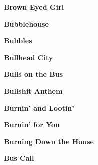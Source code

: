 \begin{center}\textbf{Brown Eyed Girl}\end{center}
\newline
\vspace{10pt} 
\begin{center}\textbf{Bubblehouse}\end{center}
\newline
\vspace{10pt} 
\begin{center}\textbf{Bubbles}\end{center}
\newline
\vspace{10pt} 
\begin{center}\textbf{Bullhead City}\end{center}
\newline
\vspace{10pt} 
\begin{center}\textbf{Bulls on the Bus}\end{center}
\newline
\vspace{10pt} 
\begin{center}\textbf{Bullshit Anthem}\end{center}
\newline
\vspace{10pt} 
\begin{center}\textbf{Burnin' and Lootin'}\end{center}
\newline
\vspace{10pt} 
\begin{center}\textbf{Burnin' for You}\end{center}
\newline
\vspace{10pt} 
\begin{center}\textbf{Burning Down the House}\end{center}
\newline
\vspace{10pt} 
\begin{center}\textbf{Bus Call}\end{center}
